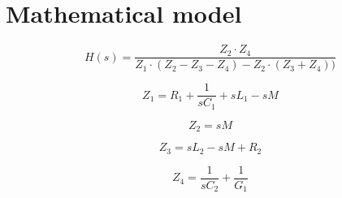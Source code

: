 \section{Mathematical model}

\begin{equation}
    H(s) = \frac{Z_2 \cdot Z_4}{Z_1 \cdot (Z_2 - Z_3 - Z_4) - Z_2 \cdot (Z_3 + Z_4))}
\end{equation}

\begin{equation}
    Z_1 = R_1 + \frac{1}{s C_1} + s L_1 - s M
\end{equation}

\begin{equation}
    Z_2 = s M
\end{equation}

\begin{equation}
    Z_3 = s L_2 - s M + R_2
\end{equation}

\begin{equation}
    Z_4 = \frac{1}{s C_2} + \frac{1}{G_1}
\end{equation}